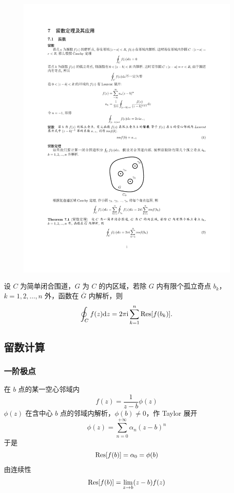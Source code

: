 \begin{figure}[H]
    \centering
    \includegraphics{figures/liushu1.pdf}
    \caption{}
\end{figure}

\begin{theorem}[留数定理]
    设 $C$ 为简单闭合围道，$G$ 为 $C$ 的内区域，若除 $G$ 内有限个孤立奇点 $b_k$，$k=1,2,\dots,n$ 外，函数在 $\overline{G}$ 内解析，则
    $$\oint_{C}f(z)\dd z=2\pi\i\sum_{k=1}^{n}\Res[f(b_k)].$$
\end{theorem}

\subsection{留数计算}

\subsubsection{一阶极点}

在 $b$ 点的某一空心邻域内 $$f(z)=\dfrac{1}{z-b}\phi(z)$$
$\phi(z)$ 在含中心 $b$ 点的邻域内解析，$\phi(b)\neq 0$，作 Taylor 展开 $$\phi(z)=\sum_{n=0}^{+\infty}\alpha_n(z-b)^n$$
于是 $$\Res[f(b)]=\alpha_0=\phi(b)$$
由连续性 $$\Res[f(b)]=\lim_{z\to b}(z-b)f(z)$$

